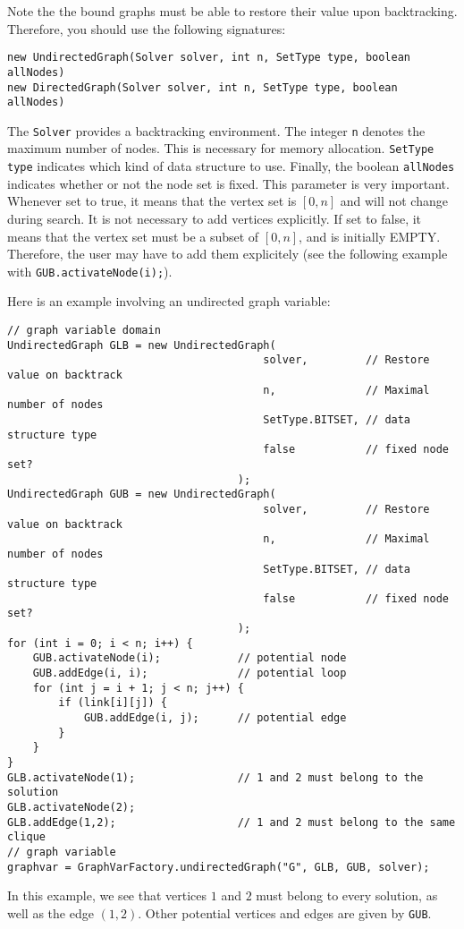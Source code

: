 \documentclass{article}
\begin{document}
Note the the bound graphs must be able to restore their value upon backtracking. 
Therefore, you should use the following signatures:
\begin{lstlisting}
new UndirectedGraph(Solver solver, int n, SetType type, boolean allNodes)
new DirectedGraph(Solver solver, int n, SetType type, boolean allNodes)
\end{lstlisting}

The \texttt{Solver} provides a backtracking environment. The integer \texttt{n} denotes the maximum number of nodes. 
This is necessary for memory allocation. \texttt{SetType type} indicates which kind of data structure to use. 
Finally, the boolean \texttt{allNodes} indicates whether or not the node set is fixed. This parameter is very important. Whenever set to true, it means that the vertex set is $[0,n]$ and will not change during search. It is not necessary to add vertices explicitly. If set to false, it means that the vertex set must be a subset of $[0,n]$, and is initially EMPTY. Therefore, the user may have to add them explicitely (see the following example with \texttt{GUB.activateNode(i);}).

Here is an example involving an undirected graph variable:

\begin{lstlisting}
// graph variable domain
UndirectedGraph GLB = new UndirectedGraph(
										solver,			// Restore value on backtrack
										n,				// Maximal number of nodes
										SetType.BITSET,	// data structure type
										false			// fixed node set?
									);
UndirectedGraph GUB = new UndirectedGraph(
										solver,			// Restore value on backtrack
										n,				// Maximal number of nodes
										SetType.BITSET,	// data structure type
										false			// fixed node set?
									);
for (int i = 0; i < n; i++) {
	GUB.activateNode(i);			// potential node
	GUB.addEdge(i, i);				// potential loop
	for (int j = i + 1; j < n; j++) {
		if (link[i][j]) {
			GUB.addEdge(i, j);		// potential edge
		}
	}
}
GLB.activateNode(1);				// 1 and 2 must belong to the solution
GLB.activateNode(2);
GLB.addEdge(1,2);					// 1 and 2 must belong to the same clique
// graph variable
graphvar = GraphVarFactory.undirectedGraph("G", GLB, GUB, solver);
\end{lstlisting}

In this example, we see that vertices $1$ and $2$ must belong to every solution, as well as the edge $(1,2)$. 
Other potential vertices and edges are given by \texttt{GUB}.
\end{document}
